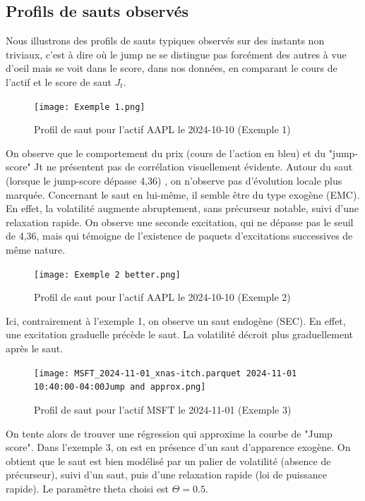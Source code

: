 \documentclass[10pt,a4paper]{article}
\theoremstyle{definition}
\theoremstyle{remark}
\begin{document}
\begin{itemize}
    \subsection{Profils de sauts observés}

    Nous illustrons des profils de sauts typiques observés sur des instants non triviaux, c'est à dire où le jump ne se distingue pas forcément des autres à vue d'oeil mais se voit dans le score, dans nos données, en comparant le cours de l'actif et le score de saut $J_t$.

    \begin{figure}[H]
        \centering
        \texttt{[image: Exemple 1.png]}
        \caption{Profil de saut pour l'actif AAPL le 2024-10-10 (Exemple 1)}
        \label{fig:jump_example_1}
    \end{figure}
    
    On observe que le comportement du prix (cours de l'action en bleu) et du "jump-score" Jt ne présentent pas de corrélation visuellement évidente. Autour du saut (lorsque le jump-score dépasse 4,36) , on n'observe pas d'évolution locale plus marquée. Concernant le saut en lui-même, il semble être du type exogène (EMC). En effet, la volatilité augmente abruptement, sans précurseur notable, suivi d'une relaxation rapide. On observe une seconde excitation, qui ne dépasse pas le seuil de 4,36, mais qui témoigne de l'existence de paquets d'excitations successives de même nature. 

    \vspace{1cm}

    \begin{figure}[H]
        \centering
        \texttt{[image: Exemple 2 better.png]}
        \caption{Profil de saut pour l'actif AAPL le 2024-10-10 (Exemple 2)}
        \label{fig:jump_example_2}
    \end{figure}

    Ici, contrairement à l'exemple 1, on observe un saut endogène (SEC). En effet, une excitation graduelle précède le saut. La volatilité décroit plus graduellement après le saut. 
    

    \vspace{1cm}

    \begin{figure}[H]
        \centering
        \texttt{[image: MSFT\_2024-11-01\_xnas-itch.parquet 2024-11-01 10:40:00-04:00Jump and approx.png]}
        \caption{Profil de saut pour l'actif MSFT le 2024-11-01 (Exemple 3)}
        \label{fig:jump_example_3}
    \end{figure}
    On tente alors de trouver une régression qui approxime la courbe de "Jump score". Dans l'exemple 3, on est en présence d'un saut d'apparence exogène. On obtient que le saut est bien modélisé par un palier de volatilité (absence de précurseur), suivi d'un saut, puis d'une relaxation rapide (loi de puissance rapide). Le paramètre theta choisi est $\Theta = 0.5$. 


\end{itemize}
\end{document}
